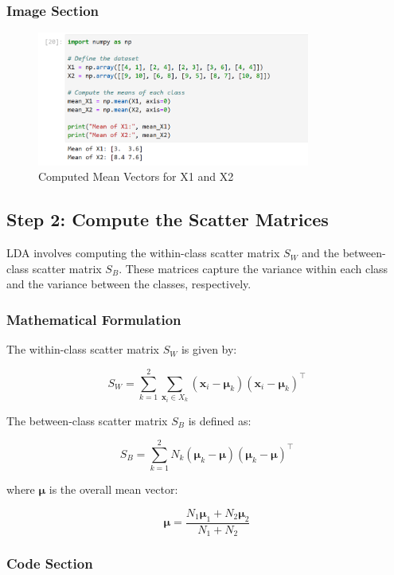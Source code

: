 \documentclass{exam}
\begin{document}
\subsubsection*{Image Section}

\begin{figure}[h!]
    \centering
    \includegraphics[width=0.8\textwidth]{images/mean_x1_x2.png}
    \caption{Computed Mean Vectors for X1 and X2}
    \label{fig:mean_x1_x2}
\end{figure}

\newpage

\subsection{Step 2: Compute the Scatter Matrices}

LDA involves computing the within-class scatter matrix \( S_W \) and the between-class scatter matrix \( S_B \). These matrices capture the variance within each class and the variance between the classes, respectively.

\subsubsection*{Mathematical Formulation}

The within-class scatter matrix \( S_W \) is given by:

\[
S_W = \sum_{k=1}^{2} \sum_{\mathbf{x}_i \in X_k} (\mathbf{x}_i - \mathbf{\mu}_k)(\mathbf{x}_i - \mathbf{\mu}_k)^\top
\]

The between-class scatter matrix \( S_B \) is defined as:

\[
S_B = \sum_{k=1}^{2} N_k (\mathbf{\mu}_k - \mathbf{\mu})(\mathbf{\mu}_k - \mathbf{\mu})^\top
\]

where \( \mathbf{\mu} \) is the overall mean vector:

\[
\mathbf{\mu} = \frac{N_1 \mathbf{\mu}_1 + N_2 \mathbf{\mu}_2}{N_1 + N_2}
\]

\subsubsection*{Code Section}
\end{document}
